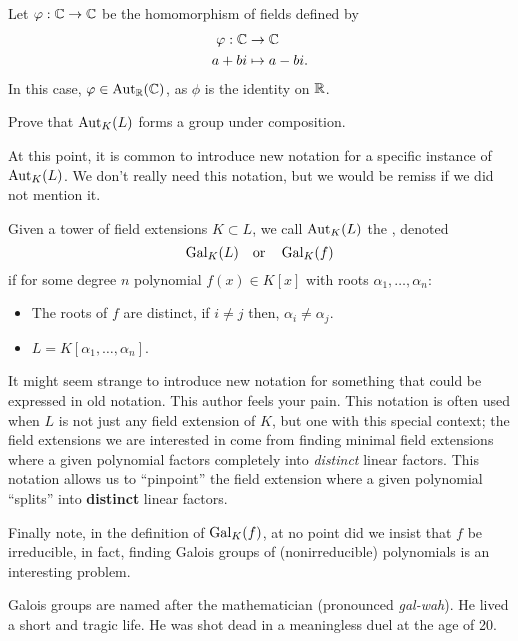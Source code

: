 \documentclass{ximera}
\begin{document}
\begin{example}
  Let $\varphi:\mathbb C\to\mathbb C$ be the homomorphism of fields defined by
  \begin{align*}
    \varphi : \mathbb C &\to \mathbb C\\
    a+bi &\mapsto a - bi.
  \end{align*}
  In this case, $\varphi \in \operatorname{Aut}_\mathbb R(\mathbb C)$, as $\phi$ is the identity on
  $\mathbb R$.
\end{example}


\begin{exercise}
  Prove that $\operatorname{Aut}_K(L)$ forms a group under composition.
\end{exercise}


At this point, it is common to introduce new notation for a specific
instance of $\operatorname{Aut}_K(L)$. We don't really need this notation, but we would
be remiss if we did not mention it.


Given a tower of field extensions $K\subset L$, we call $\operatorname{Aut}_K(L)$
the ,
denoted
  \[
  \gal_K(L)\index{galKL@$\gal_K(L)$} \quad\text{or}\quad\gal_K(f)
  \]
  if for some degree $n$ polynomial $f(x)\in K[x]$ with roots $\alpha_1,\dots, \alpha_n$:
  \begin{itemize}
  \item The roots of $f$ are distinct, if $i\ne j$ then, $\alpha_i \ne
    \alpha_j$.
  \item $L = K[\alpha_1,\dots,\alpha_n]$.
  \end{itemize}
It might seem strange to introduce new notation for something that
could be expressed in old notation. This author feels your pain. This
notation is often used when $L$ is not just any field extension of
$K$, but one with this special context; the field extensions we are
interested in come from finding minimal field extensions where a given
polynomial factors completely into \textit{distinct} linear factors.
This notation allows us to ``pinpoint'' the field extension where a
given polynomial ``splits'' into \textbf{distinct} linear factors.

Finally note, in the definition of $\operatorname{Gal}_K(f)$, at no point did we
insist that $f$ be irreducible, in fact, finding Galois groups of
(nonirreducible) polynomials is an interesting problem.


Galois groups are named after the mathematician  (pronounced
\textit{gal-wah}). He lived a short and tragic life. He was shot dead
in a meaningless duel at the age of 20.
\end{document}
